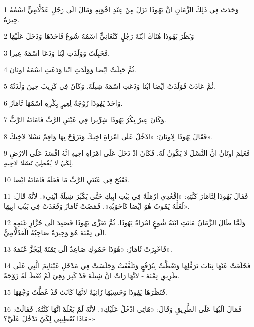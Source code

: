 \par 1 وَحَدَثَ فِي ذَلِكَ الزَّمَانِ انَّ يَهُوذَا نَزَلَ مِنْ عِنْدِ اخْوَتِهِ وَمَالَ الَى رَجُلٍ عَدُلَّامِيٍّ اسْمُهُ حِيرَةُ.
\par 2 وَنَظَرَ يَهُوذَا هُنَاكَ ابْنَةَ رَجُلٍ كَنْعَانِيٍّ اسْمُهُ شُوعٌ فَاخَذَهَا وَدَخَلَ عَلَيْهَا
\par 3 فَحَبِلَتْ وَوَلَدَتِ ابْنا وَدَعَا اسْمَهُ عِيرا.
\par 4 ثُمَّ حَبِلَتْ ايْضا وَوَلَدَتِ ابْنا وَدَعَتِ اسْمَهُ اونَانَ.
\par 5 ثُمَّ عَادَتْ فَوَلَدَتْ ايْضا ابْنا وَدَعَتِ اسْمَهُ شِيلَةَ. وَكَانَ فِي كَزِيبَ حِينَ وَلَدَتْهُ.
\par 6 وَاخَذَ يَهُوذَا زَوْجَةً لِعِيرٍ بِكْرِهِ اسْمُهَا ثَامَارُ.
\par 7 وَكَانَ عِيرٌ بِكْرُ يَهُوذَا شِرِّيرا فِي عَيْنَيِ الرَّبِّ فَامَاتَهُ الرَّبُّ.
\par 8 فَقَالَ يَهُوذَا لِاونَانَ: «ادْخُلْ عَلَى امْرَاةِ اخِيكَ وَتَزَوَّجْ بِهَا وَاقِمْ نَسْلا لاخِيكَ».
\par 9 فَعَلِمَ اونَانُ انَّ النَّسْلَ لا يَكُونُ لَهُ. فَكَانَ اذْ دَخَلَ عَلَى امْرَاةِ اخِيهِ انَّهُ افْسَدَ عَلَى الارْضِ لِكَيْ لا يُعْطِيَ نَسْلا لاخِيهِ.
\par 10 فَقَبُحَ فِي عَيْنَيِ الرَّبِّ مَا فَعَلَهُ فَامَاتَهُ ايْضا.
\par 11 فَقَالَ يَهُوذَا لِثَامَارَ كَنَّتِهِ: «اقْعُدِي ارْمَلَةً فِي بَيْتِ ابِيكِ حَتَّى يَكْبُرَ شِيلَةُ ابْنِي». لانَّهُ قَالَ: «لَعَلَّهُ يَمُوتُ هُوَ ايْضا كَاخَوَيْهِ». فَمَضَتْ ثَامَارُ وَقَعَدَتْ فِي بَيْتِ ابِيهَا.
\par 12 وَلَمَّا طَالَ الزَّمَانُ مَاتَتِ ابْنَةُ شُوعٍ امْرَاةُ يَهُوذَا. ثُمَّ تَعَزَّى يَهُوذَا فَصَعِدَ الَى جُزَّازِ غَنَمِهِ الَى تِمْنَةَ هُوَ وَحِيرَةُ صَاحِبُهُ الْعَدُلَّامِيُّ.
\par 13 فَاخْبِرَتْ ثَامَارُ: «هُوَذَا حَمُوكِ صَاعِدٌ الَى تِمْنَةَ لِيَجُزَّ غَنَمَهُ».
\par 14 فَخَلَعَتْ عَنْهَا ثِيَابَ تَرَمُّلِهَا وَتَغَطَّتْ بِبُرْقُعٍ وَتَلَفَّفَتْ وَجَلَسَتْ فِي مَدْخَلِ عَيْنَايِمَ الَّتِي عَلَى طَرِيقِ تِمْنَةَ - لانَّهَا رَاتْ انَّ شِيلَةَ قَدْ كَبِرَ وَهِيَ لَمْ تُعْطَ لَهُ زَوْجَةً.
\par 15 فَنَظَرَهَا يَهُوذَا وَحَسِبَهَا زَانِيَةً لانَّهَا كَانَتْ قَدْ غَطَّتْ وَجْهَهَا.
\par 16 فَمَالَ الَيْهَا عَلَى الطَّرِيقِ وَقَالَ: «هَاتِي ادْخُلْ عَلَيْكِ». لانَّهُ لَمْ يَعْلَمْ انَّهَا كَنَّتُهُ. فَقَالَتْ: «مَاذَا تُعْطِينِي لِكَيْ تَدْخُلَ عَلَيَّ؟»

